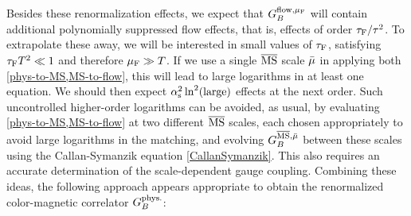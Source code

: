 \documentclass[floatfix,twocolumn,prd,showpacs,preprintnumbers,amsmath,nofootinbib,amssymb,superscriptaddress]{revtex4-2}
\begin{document}
Besides these renormalization effects, we expect that $G_{B}^{\mathrm{flow}, \mu_\mathrm{F}}$ will contain additional polynomially suppressed flow effects, that is, effects of order $\tau_\mathrm{F}/\tau^2$.
To extrapolate these away, we will be interested in small values of $\tau_\mathrm{F}$, satisfying $\tau_\mathrm{F} T^2 \ll 1$ and therefore $\mu_\mathrm{F} \gg T$.
If we use a single $\overline{\text{MS}}$ scale $\bar{\mu}$ in applying both \cref{phys-to-MS,MS-to-flow}, this will lead to large logarithms in at least one equation.
We should then expect $\alpha_{\mathrm{s}}^2 \ln^2(\mathrm{large})$ effects at the next order.
Such uncontrolled higher-order logarithms can be avoided, as usual, by evaluating \cref{phys-to-MS,MS-to-flow} at two different $\overline{\text{MS}}$ scales, each chosen appropriately to avoid large logarithms in the matching, and evolving $G_{B}^{\overline{\text{MS}},\bar{\mu}}$ between these scales using the Callan-Symanzik equation \cref{CallanSymanzik}.
This also requires an accurate determination of the scale-dependent gauge coupling.
Combining these ideas, the following approach appears appropriate to obtain the renormalized color-magnetic correlator $G_B^{\text{phys.}}$:
\end{document}

